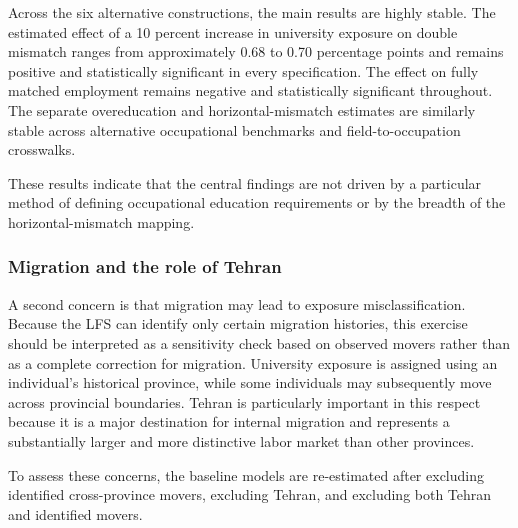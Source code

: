 Across the six alternative constructions, the main results are highly stable. The estimated effect of a 10 percent increase in university exposure on double mismatch ranges from approximately 0.68 to 0.70 percentage points and remains positive and statistically significant in every specification. The effect on fully matched employment remains negative and statistically significant throughout. The separate overeducation and horizontal-mismatch estimates are similarly stable across alternative occupational benchmarks and field-to-occupation crosswalks.

These results indicate that the central findings are not driven by a particular method of defining occupational education requirements or by the breadth of the horizontal-mismatch mapping.

\subsubsection{Migration and the role of Tehran}

A second concern is that migration may lead to exposure misclassification. Because the LFS can identify only certain migration histories, this exercise should be interpreted as a sensitivity check based on observed movers rather than as a complete correction for migration. University exposure is assigned using an individual's historical province, while some individuals may subsequently move across provincial boundaries. Tehran is particularly important in this respect because it is a major destination for internal migration and represents a substantially larger and more distinctive labor market than other provinces.

To assess these concerns, the baseline models are re-estimated after excluding identified cross-province movers, excluding Tehran, and excluding both Tehran and identified movers.

